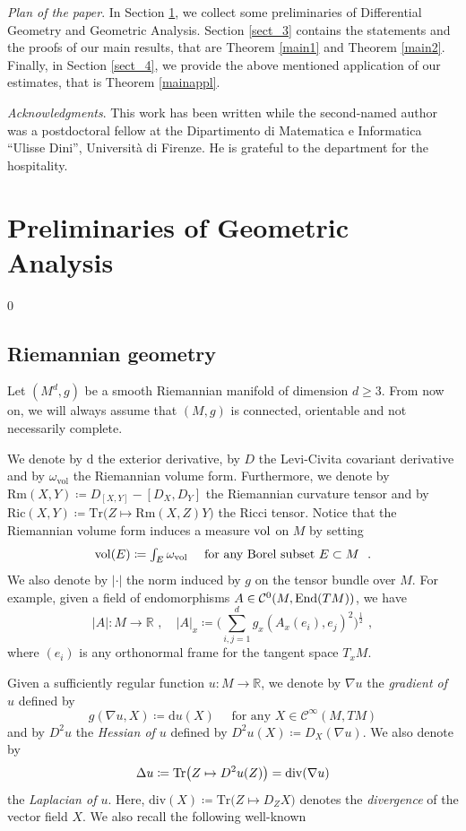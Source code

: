 \documentclass[10pt, a4paper, reqno, oneside]{amsart}
\theoremstyle{plain}
\theoremstyle{definition}
\theoremstyle{plain}
\theoremstyle{definition}
\theoremstyle{plain}
\renewcommand{\=}{:=}
\begin{document}
\medskip
\noindent \textit{Plan of the paper}. In Section \ref{sect_2}, we collect some preliminaries of Differential Geometry and Geometric Analysis. Section \ref{sect_3} contains the statements and the proofs of our main results, that are Theorem \ref{main1} and Theorem \ref{main2}. Finally, in Section \ref{sect_4}, we provide the above mentioned application of our estimates, that is Theorem \ref{mainappl}.

\medskip
\noindent \textit{Acknowledgments}. This work has been written while the second-named author was a postdoctoral fellow at the Dipartimento di Matematica e Informatica ``Ulisse Dini'', Universit\`a di Firenze. He is grateful to the
department for the hospitality.

\medskip
\section{Preliminaries of Geometric Analysis} \label{sect_2}
\setcounter{equation} 0

\subsection{Riemannian geometry} \hfill \par

Let $(M^d,g)$ be a smooth Riemannian manifold of dimension $d \geq 3$. From now on, we will always assume that $(M,g)$ is connected, orientable and not necessarily complete.

We denote by $\mathrm{d}$ the exterior derivative, by $D$ the Levi-Civita covariant derivative and by $\omega_{\mathrm{vol}}$ the Rieman\-nian volume form. Furthermore, we denote by $\mathrm{Rm}(X,Y) \coloneqq D_{[X,Y]}-[D_X,D_Y]$ the Riemannian curvature tensor and by $\mathrm{Ric}(X,Y) \coloneqq \mathrm{Tr}\big(Z \mapsto \mathrm{Rm}(X,Z)Y\big)$ the Ricci tensor. Notice that the Riemannian volume form induces a measure ${\rm vol}$ on $M$ by setting $${\rm vol}(E) \coloneqq \textstyle\int_E \omega_{\mathrm{vol}} \quad \text{ for any Borel subset $E \subset M$ } \,\, .$$ We also denote by $|\cdot|$ the norm induced by $g$ on the tensor bundle over $M$. For example, given a field of endomorphisms $A \in \mathcal{C}^{0}(M,{\rm End}(TM))$, we have $$|A|: M \to \mathbb{R} \,\, , \quad |A|_x \coloneqq \Big(\sum_{i,j=1}^d g_x(A_x(e_i),e_j)^2\Big)^{\frac12} \,\, ,$$ where $(e_i)$ is any orthonormal frame for the tangent space $T_xM$. \smallskip

Given a sufficiently regular function $u: M \to \mathbb{R}$, we denote by $\nabla u$ the {\it gradient of $u$} defined by $$g(\nabla u,X) \coloneqq \mathrm{d}u (X) \quad \text{ for any } X \in \mathcal{C}^{\infty}(M,TM)$$ and by $D^2 u$ the {\it Hessian of $u$} defined by $D^2 u(X) \coloneqq D_X(\nabla u)$. We also denote by
$$
\Delta u \coloneqq \mathrm{Tr}\big(Z \mapsto D^2u(Z)\big) = {\rm div}(\nabla u)
$$
the {\it Laplacian of $u$}. Here, $\mathrm{div}(X) \coloneqq \mathrm{Tr}\big(Z \mapsto D_ZX\big)$ denotes the {\it divergence} of the vector field $X$. We also recall the following well-known
\end{document}
